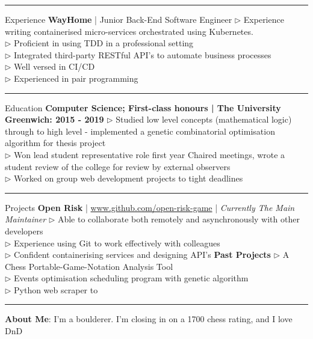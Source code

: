 \documentclass[12pt,twoside]{article}
\begin{document}
\vspace{0.5em}
\hrule
\vspace{0.5em}

\headedsection
    {Experience}
    {
        \textbf{WayHome} | Junior Back-End Software Engineer}
    {
        $\triangleright$ Experience writing containerised micro-services
        orchestrated using Kubernetes. \\
        $\triangleright$ Proficient in using TDD in a professional setting \\
        $\triangleright$ Integrated third-party RESTful API's to automate business processes \\
        $\triangleright$ Well versed in CI/CD \\
        $\triangleright$ Experienced in pair programming
    }

\vspace{0.5em}
\hrule
\vspace{0.5em}

\headedsection
    {Education}
    {
        \textbf{Computer Science; First-class honours | The University
        Greenwich: 2015 - 2019}
    }
    {
        $\triangleright$ Studied low level concepts (mathematical logic)
        through to high level - implemented a genetic combinatorial optimisation
        algorithm for thesis project \\
        $\triangleright$ Won lead student representative role first year
        Chaired meetings, wrote a student review of the college for review by
        external observers \\
        $\triangleright$ Worked on group web development projects to tight deadlines
    }

\vspace{0.5em}
\hrule
\vspace{0.5em}

\headedsection
    {Projects}
    {\textbf{Open Risk} | \url{www.github.com/open-risk-game} | \textit{Currently The Main Maintainer}}
    {
        $\triangleright$ Able to collaborate both remotely and asynchronously with other developers \\
        $\triangleright$ Experience using Git to work effectively with colleagues \\
        $\triangleright$ Confident containerising services and designing API's
    }
\headedsection
    {}
    {\textbf{Past Projects}}
    {
        $\triangleright$ A Chess Portable-Game-Notation Analysis Tool \\
        $\triangleright$ Events optimisation scheduling program with genetic algorithm \\
        $\triangleright$ Python web scraper to 
    }

\vspace{0.5em}
\hrule
\vspace{0.5em}

\hspace{-1.3em}\textbf{About Me}: I'm a boulderer. I'm closing in on a 1700 chess rating, and I love DnD
\end{document}
